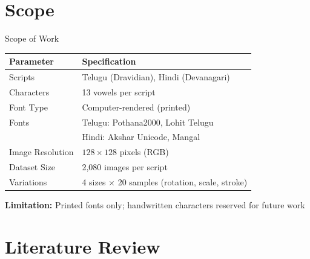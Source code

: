\documentclass[aspectratio=169, 12pt]{beamer}
\begin{document}
\section{Scope}

\begin{frame}{Scope of Work}
    \begin{table}
    \centering
    \renewcommand{\arraystretch}{1.3}
    \begin{tabular}{l l}
        \toprule
        \textbf{Parameter} & \textbf{Specification} \\
        \midrule
        Scripts & Telugu (Dravidian), Hindi (Devanagari) \\
        Characters & 13 vowels per script \\
        Font Type & Computer-rendered (printed) \\
        Fonts & Telugu: Pothana2000, Lohit Telugu \\
        & Hindi: Akshar Unicode, Mangal \\
        Image Resolution & $128 \times 128$ pixels (RGB) \\
        Dataset Size & 2,080 images per script \\
        Variations & 4 sizes × 20 samples (rotation, scale, stroke) \\
        \bottomrule
    \end{tabular}
    \end{table}
    
    \vspace{0.3cm}
    \small
    \textbf{Limitation:} Printed fonts only; handwritten characters reserved for future work
\end{frame}

\section{Literature Review}
\end{document}
